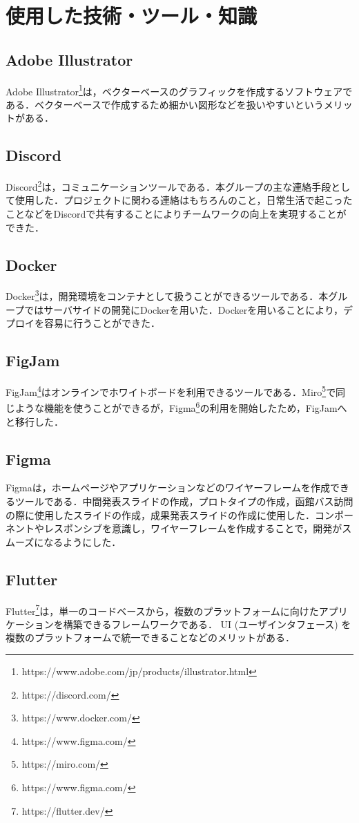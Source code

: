 \chapter{使用した技術・ツール・知識}

\section{Adobe Illustrator}
Adobe Illustrator\footnote{https://www.adobe.com/jp/products/illustrator.html}は，ベクターベースのグラフィックを作成するソフトウェアである．ベクターベースで作成するため細かい図形などを扱いやすいというメリットがある．

\section{Discord}
Discord\footnote{https://discord.com/}は，コミュニケーションツールである．本グループの主な連絡手段として使用した．プロジェクトに関わる連絡はもちろんのこと，日常生活で起こったことなどをDiscordで共有することによりチームワークの向上を実現することができた．

\section{Docker}
Docker\footnote{https://www.docker.com/}は，開発環境をコンテナとして扱うことができるツールである．本グループではサーバサイドの開発にDockerを用いた．Dockerを用いることにより，デプロイを容易に行うことができた．

\section{FigJam}
FigJam\footnote{https://www.figma.com/}はオンラインでホワイトボードを利用できるツールである．Miro\footnote{https://miro.com/}で同じような機能を使うことができるが，Figma\footnote{https://www.figma.com/}の利用を開始したため，FigJamへと移行した．

\section{Figma}
Figmaは，ホームページやアプリケーションなどのワイヤーフレームを作成できるツールである．中間発表スライドの作成，プロトタイプの作成，函館バス訪問の際に使用したスライドの作成，成果発表スライドの作成に使用した．コンポーネントやレスポンシブを意識し，ワイヤーフレームを作成することで，開発がスムーズになるようにした．

\section{Flutter}
Flutter\footnote{https://flutter.dev/}は，単一のコードベースから，複数のプラットフォームに向けたアプリケーションを構築できるフレームワークである．
UI (ユーザインタフェース) を複数のプラットフォームで統一できることなどのメリットがある．

